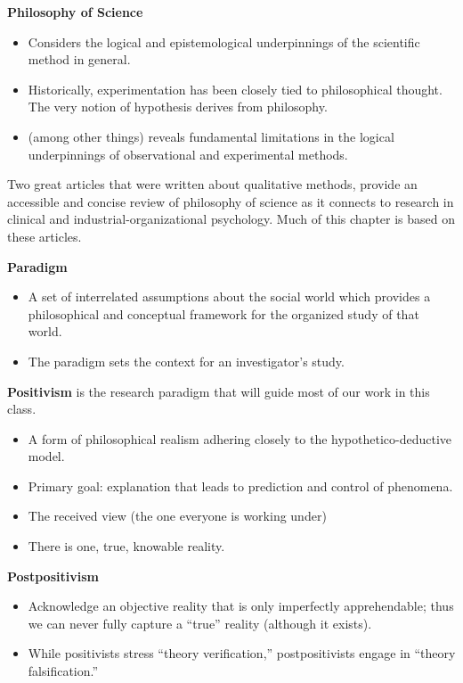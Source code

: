 \documentclass[
  english,
]{book}
\providecommand{\tightlist}{%
  \setlength{\itemsep}{0pt}\setlength{\parskip}{0pt}}
\begin{document}
\textbf{Philosophy of Science}

\begin{itemize}
\tightlist
\item
  Considers the logical and epistemological underpinnings of the scientific method in general.
\item
  Historically, experimentation has been closely tied to philosophical thought. The very notion of hypothesis derives from philosophy.
\item
  (among other things) reveals fundamental limitations in the logical underpinnings of observational and experimental methods.
\end{itemize}

Two great articles that were written about qualitative methods, provide an accessible and concise review of philosophy of science as it connects to research in clinical \citep{ponterotto_qualitative_2005} and industrial-organizational \citep{cortina_doing_2013} psychology. Much of this chapter is based on these articles.

\textbf{Paradigm}

\begin{itemize}
\tightlist
\item
  A set of interrelated assumptions about the social world which provides a philosophical and conceptual framework for the organized study of that world.
\item
  The paradigm sets the context for an investigator's study.
\end{itemize}

\textbf{Positivism} is the research paradigm that will guide most of our work in this class.

\begin{itemize}
\tightlist
\item
  A form of philosophical realism adhering closely to the hypothetico-deductive model.
\item
  Primary goal: explanation that leads to prediction and control of phenomena.
\item
  The received view (the one everyone is working under)
\item
  There is one, true, knowable reality.
\end{itemize}

\textbf{Postpositivism}

\begin{itemize}
\tightlist
\item
  Acknowledge an objective reality that is only imperfectly apprehendable; thus we can never fully capture a ``true'' reality (although it exists).
\item
  While positivists stress ``theory verification,'' postpositivists engage in ``theory falsification.''
\end{itemize}
\end{document}
